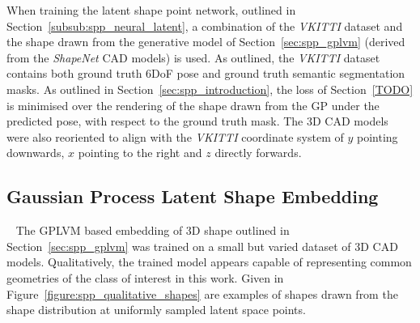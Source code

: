 When training the latent shape point network, outlined in Section~\ref{subsub:spp_neural_latent}, a combination of the \textit{VKITTI} 
dataset and the shape drawn from the generative model of Section~\ref{sec:spp_gplvm} (derived from the \textit{ShapeNet} CAD models) 
is used. As outlined, the \textit{VKITTI} dataset contains both ground truth 6DoF pose and ground truth semantic segmentation masks. As 
outlined in Section~\ref{sec:spp_introduction}, the loss of Section~\ref{TODO} is minimised over the rendering of the shape drawn 
from the GP under the predicted pose, with respect to the ground truth mask. The 3D CAD models were also reoriented to align with the 
\textit{VKITTI} coordinate system of \( y \) pointing downwards, \( x \) pointing to the right and \( z \) directly forwards.

\subsection{Gaussian Process Latent Shape Embedding}
~\label{subsec:spp_qualitative_shape}
The GPLVM based embedding of 3D shape outlined in Section~\ref{sec:spp_gplvm} was trained on a small but varied dataset of 3D CAD 
models. Qualitatively, the trained model appears capable of representing common geometries of the class of interest in this work. 
Given in Figure~\ref{figure:spp_qualitative_shapes} are examples of shapes drawn from the shape distribution at uniformly sampled 
latent space points.

